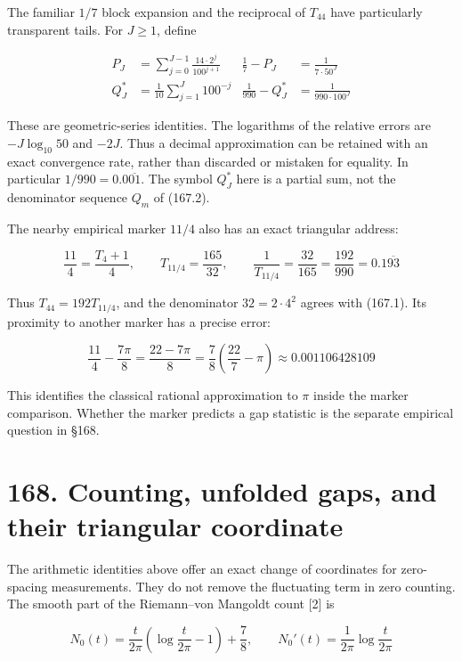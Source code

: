 \documentclass[
  11pt,
]{book}
\begin{document}
The familiar \(1/7\) block expansion and the reciprocal of \(T_{44}\)
have particularly transparent tails. For \(J\ge1\), define

\[
\begin{aligned}
P_J&=\sum_{j=0}^{J-1}\frac{14\cdot2^j}{100^{j+1}}
&\frac17-P_J&=\frac1{7\cdot50^J}\\
Q_J^*&=\frac1{10}\sum_{j=1}^J100^{-j}
&\frac1{990}-Q_J^*&=\frac1{990\cdot100^J}
\end{aligned}
\tag{167.4}
\]

These are geometric-series identities. The logarithms of the relative
errors are \(-J\log_{10}50\) and \(-2J\). Thus a decimal approximation
can be retained with an exact convergence rate, rather than discarded or
mistaken for equality. In particular \(1/990=0.0\overline{01}\). The
symbol \(Q_J^*\) here is a partial sum, not the denominator sequence
\(Q_m\) of (167.2).

The nearby empirical marker \(11/4\) also has an exact triangular
address:

\[
\frac{11}{4}=\frac{T_4+1}{4},\qquad
T_{11/4}=\frac{165}{32},\qquad
\frac1{T_{11/4}}=\frac{32}{165}=\frac{192}{990}
=0.1\overline{93}
\tag{167.5}
\]

Thus \(T_{44}=192T_{11/4}\), and the denominator \(32=2\cdot4^2\) agrees
with (167.1). Its proximity to another marker has a precise error:

\[
\frac{11}{4}-\frac{7\pi}{8}
=\frac{22-7\pi}{8}
=\frac78\left(\frac{22}{7}-\pi\right)
\approx0.001106428109
\tag{167.6}
\]

This identifies the classical rational approximation to \(\pi\) inside
the marker comparison. Whether the marker predicts a gap statistic is
the separate empirical question in §168.

\section{168. Counting, unfolded gaps, and their triangular
coordinate}\label{counting-unfolded-gaps-and-their-triangular-coordinate}

The arithmetic identities above offer an exact change of coordinates for
zero-spacing measurements. They do not remove the fluctuating term in
zero counting. The smooth part of the Riemann--von Mangoldt count
{[}2{]} is

\[
N_0(t)=\frac{t}{2\pi}\left(\log\frac{t}{2\pi}-1\right)+\frac78,
\qquad N_0'(t)=\frac1{2\pi}\log\frac{t}{2\pi}
\tag{168.2}
\]
\end{document}
